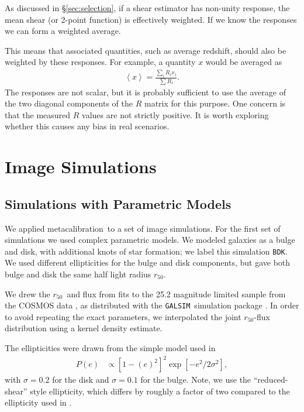 \documentclass[a4paper,fleqn,usenatbib]{mnras}
\newcommand{\hlr}{$r_{50}$}
\newcommand{\mcal}{metacalibration}
\newcommand{\bdsim}{\texttt{BDK}}
\newcommand{\galsim}{\texttt{GALSIM}}
\begin{document}
As discussed in \S \ref{sec:selection}, if a shear estimator has
non-unity response, the mean shear (or 2-point function) is effectively
weighted.  If we know the responses we can form a weighted average.

This means that associated quantities, such as average redshift, should also be
weighted by these responses.  For example, a quantity $x$ would be averaged
as
\begin{align}
    \left< x \right> = \frac{\sum_i R_i x_i}{\sum R_i}.
\end{align}
The responses are not scalar, but it is probably sufficient
to use the average of the two diagonal components of the $R$ matrix
for this purpose. One concern is that the measured $R$ values are not
strictly positive.  It is worth exploring whether this causes
any bias in real scenarios.

\section{Image Simulations} \label{sec:sims}

\subsection{Simulations with Parametric Models} \label{sec:bdsim}

We applied \mcal\ to a set of image simulations.  For the first set of
simulations we used complex parametric models.  We modeled galaxies as a bulge
and disk, with additional knots of star formation; we label this simulation
\bdsim.  We used different ellipticities for the bulge and disk components, but
gave both bulge and disk the same half light radius \hlr.

We drew the \hlr\ and flux from fits \citep{LacknerGunn2012} to the 25.2
magnitude limited sample from the COSMOS data
\citep{Scoville2007a,Scoville2007b}, as distributed with the \galsim\
simulation package \citep{GALSIM2015}.  In order to avoid repeating the exact
parameters, we interpolated the joint \hlr-flux distribution using a kernel
density estimate.

The ellipticities were drawn from the simple model used in \cite{ba14}
\begin{align}
    P(e) &\propto \left[1-(e)^2\right]^2 \exp\left[-e^2/2\sigma^2\right],
\end{align}
with $\sigma=0.2$ for the disk and $\sigma=0.1$ for the bulge.  Note, we use
the ``reduced-shear'' style ellipticity, which differs by roughly a factor of
two compared to the ellipticity used in \citet{bfd2016}.
\end{document}
